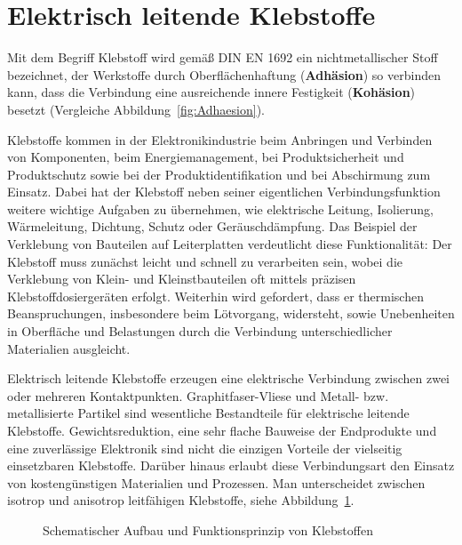 \section{Elektrisch leitende Klebstoffe}
\label{sec:Klebstoff}

Mit dem Begriff Klebstoff wird gemäß DIN EN 1692 ein nichtmetallischer Stoff bezeichnet, der Werkstoffe durch Oberflächenhaftung ({\bf Adhäsion}) so verbinden kann, dass die Verbindung eine ausreichende innere Festigkeit ({\bf Kohäsion}) besetzt (Vergleiche Abbildung~\ref{fig:Adhaesion}).

Klebstoffe kommen in der Elektronikindustrie beim Anbringen und Verbinden von Komponenten, beim Energiemanagement, bei Produktsicherheit und Produktschutz sowie bei der Produktidentifikation und bei Abschirmung zum Einsatz. Dabei hat der Klebstoff neben seiner eigentlichen Verbindungsfunktion weitere wichtige Aufgaben zu übernehmen, wie elektrische Leitung, Isolierung, Wärmeleitung, Dichtung, Schutz oder Geräuschdämpfung. Das Beispiel der Verklebung von Bauteilen auf Leiterplatten verdeutlicht diese Funktionalität: Der Klebstoff muss zunächst leicht und schnell zu verarbeiten sein, wobei die Verklebung von Klein- und Kleinstbauteilen oft mittels präzisen Klebstoffdosiergeräten erfolgt. Weiterhin wird gefordert, dass er thermischen Beanspruchungen, insbesondere beim Lötvorgang, widersteht, sowie Unebenheiten in Oberfläche und Belastungen durch die Verbindung unterschiedlicher Materialien ausgleicht.

Elektrisch leitende Klebstoffe erzeugen eine elektrische Verbindung zwischen zwei oder mehreren Kontaktpunkten. Graphitfaser-Vliese und Metall- bzw. metallisierte Partikel sind wesentliche Bestandteile für elektrische leitende Klebstoffe. Gewichtsreduktion, eine sehr flache Bauweise der Endprodukte und eine zuverlässige Elektronik sind nicht die einzigen Vorteile der vielseitig einsetzbaren Klebstoffe. Darüber hinaus erlaubt diese Verbindungsart den Einsatz von kostengünstigen Materialien und Prozessen. Man unterscheidet zwischen isotrop und anisotrop leitfähigen Klebstoffe, siehe Abbildung~\ref{fig:Klebstoffen}.

\begin{figure}[H]
\begin{center} 
\caption{Schematischer Aufbau und Funktionsprinzip von Klebstoffen}
\label{fig:Klebstoffen}
\end{center}
\end{figure}

